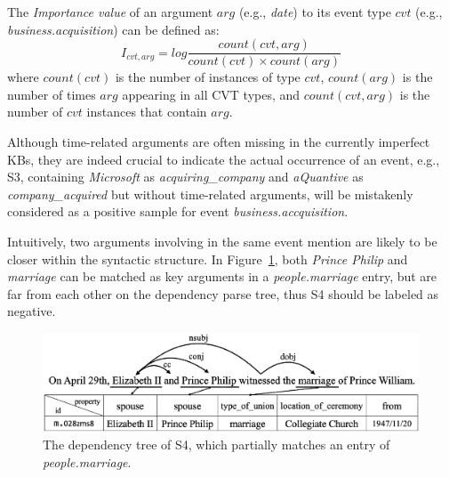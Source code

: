 The \emph{Importance value} of an argument $arg$ (e.g., \emph{date}) to its event type $cvt$ (e.g., \emph{business.acquisition}) can be defined as:
\begin{equation}
	I_{cvt, arg} = log \frac{count(cvt, arg)}{count(cvt) \times count(arg)} 
\end{equation}
where $count(cvt)$ is the number of instances of type $cvt$, $count(arg)$ is the number of times $arg$ appearing in all CVT types, and $count(cvt, arg)$ is the number of $cvt$ instances that contain $arg$.

Although time-related arguments are often missing in the currently imperfect KBs, 
they are indeed crucial to indicate the actual occurrence of an event, e.g., S3, containing \emph{Microsoft} as \emph{acquiring\_company} and \emph{aQuantive} as \emph{company\_acquired} but without time-related arguments, will be mistakenly considered as a positive sample for event \emph{business.accquisition}.

Intuitively, two arguments involving in the same event mention are likely to be closer within the syntactic structure.
In Figure~\ref{fig:2}, both \emph{Prince Philip} and \emph{marriage} can be matched as key arguments in a \textit{people.marriage} entry, but are far from each other on the dependency parse tree, thus S4 should be labeled as negative.

\begin{figure}
\centering
	\includegraphics[width=.47\textwidth]{deppath3.eps}
	\caption{The dependency tree of S4, which partially matches an entry of \emph{people.marriage}. \label{fig:2}}
\end{figure}

